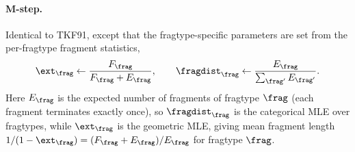 \paragraph{M-step.}
Identical to TKF91, except that the fragtype-specific parameters are set from the
per-fragtype fragment statistics,
\[
\ext_\frag \leftarrow \frac{F_\frag}{F_\frag + E_\frag},
\qquad
\fragdist_\frag \leftarrow \frac{E_\frag}{\sum_{\frag'} E_{\frag'}}.
\]
Here $E_\frag$ is the expected number of fragments of fragtype $\frag$ (each
fragment terminates exactly once), so $\fragdist_\frag$ is the categorical MLE
over fragtypes, while $\ext_\frag$ is the geometric MLE, giving mean fragment
length $1/(1-\ext_\frag) = (F_\frag + E_\frag)/E_\frag$ for fragtype $\frag$.

